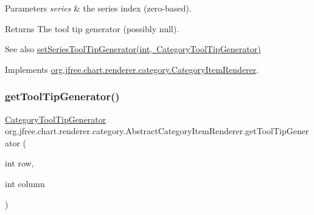 \begin{DoxyParams}{Parameters}
{\em series} & the series index (zero-\/based).\\
\hline
\end{DoxyParams}
\begin{DoxyReturn}{Returns}
The tool tip generator (possibly {\ttfamily null}).
\end{DoxyReturn}
\begin{DoxySeeAlso}{See also}
\mbox{\hyperlink{classorg_1_1jfree_1_1chart_1_1renderer_1_1category_1_1_abstract_category_item_renderer_ad4d7d645eac3287a01ebfaa2bf9776ac}{set\+Series\+Tool\+Tip\+Generator(int, Category\+Tool\+Tip\+Generator)}} 
\end{DoxySeeAlso}


Implements \mbox{\hyperlink{interfaceorg_1_1jfree_1_1chart_1_1renderer_1_1category_1_1_category_item_renderer_a9266001456365d0bfa851db45a7c281f}{org.\+jfree.\+chart.\+renderer.\+category.\+Category\+Item\+Renderer}}.

\mbox{\label{classorg_1_1jfree_1_1chart_1_1renderer_1_1category_1_1_abstract_category_item_renderer_a79d87ce1ccfe15b1be501fd600c46b21}} 
\subsubsection{\texorpdfstring{get\+Tool\+Tip\+Generator()}{getToolTipGenerator()}\hspace{0.1cm}{\footnotesize\ttfamily [1/2]}}
{\footnotesize\ttfamily \mbox{\hyperlink{interfaceorg_1_1jfree_1_1chart_1_1labels_1_1_category_tool_tip_generator}{Category\+Tool\+Tip\+Generator}} org.\+jfree.\+chart.\+renderer.\+category.\+Abstract\+Category\+Item\+Renderer.\+get\+Tool\+Tip\+Generator (\begin{DoxyParamCaption}\item[{int}]{row,  }\item[{int}]{column }\end{DoxyParamCaption})}

